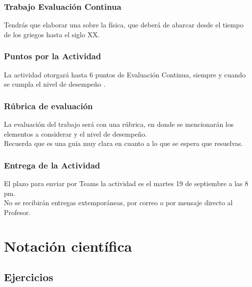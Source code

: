 \documentclass[14pt]{beamer}
\begin{document}
\begin{frame}
\frametitle{Trabajo Evaluación Continua}
Tendrás que elaborar una  sobre la física, que deberá de abarcar desde el tiempo de los griegos hasta el siglo XX.
\end{frame}
\begin{frame}
\frametitle{Puntos por la Actividad}
La actividad otorgará hasta $6$ puntos de Evaluación Continua, siempre y cuando se cumpla el nivel de desempeño .
\end{frame}
\begin{frame}
\frametitle{Rúbrica de evaluación}
La evaluación del trabajo será con una rúbrica, en donde se mencionarán los elementos a considerar y el nivel de desempeño. 
\\
\bigskip
\pause
Recuerda que es una guía muy clara en cuanto a lo que se espera que resuelvas.
\end{frame}
\begin{frame}
\frametitle{Entrega de la Actividad}
El plazo para enviar por Teams la actividad es el martes 19 de septiembre a las 8 pm.
\\
\bigskip
\pause
No se recibirán entregas extemporáneas, por correo o por mensaje directo al Profesor.
\end{frame}

\section{Notación científica}
\subsection{Ejercicios}
\end{document}
